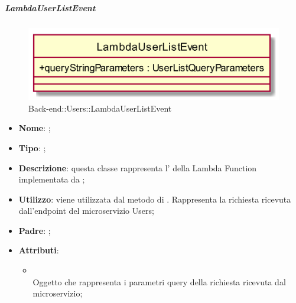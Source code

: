 \hypertarget{LambdaUserListEvent_label}{\subparagraph{LambdaUserListEvent}}
\begin{figure}[h]
	\centering
	\includegraphics[width=\textwidth,height=\textheight,keepaspectratio]{images/ClassLambdaUserListEvent.png}
	\caption{Back-end::Users::LambdaUserListEvent}
\end{figure}
\begin{itemize}
	\item \textbf{Nome}: ;
	\item \textbf{Tipo}: ;
	\item \textbf{Descrizione}: questa classe rappresenta l' della Lambda Function implementata da ;
	\item \textbf{Utilizzo}: viene utilizzata dal metodo  di . Rappresenta la richiesta ricevuta dall'endpoint del microservizio Users;
	\item \textbf{Padre}: ;
	\item \textbf{Attributi}:
	\begin{itemize}
		\item[]  \\
		Oggetto che rappresenta i parametri query della richiesta ricevuta dal microservizio;
	\end{itemize}
\end{itemize}
\FloatBarrier

